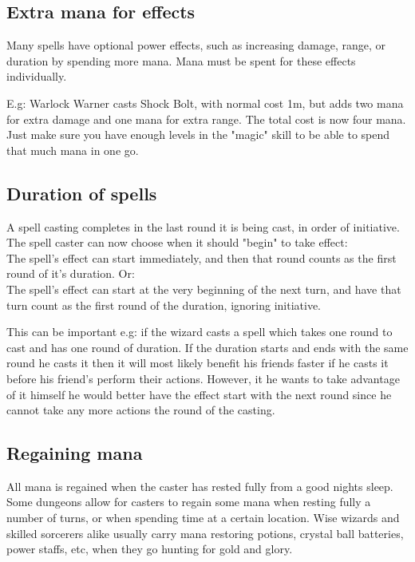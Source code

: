 \subsection*{Extra mana for effects}
Many spells have optional power effects, such as increasing damage, range, or duration by spending more mana. Mana must be spent for these effects individually.

E.g: Warlock Warner casts Shock Bolt, with normal cost 1m, but adds two mana for extra damage and one mana for extra range. The total cost is now four mana.
Just make sure you have enough levels in the "magic" skill to be able to spend that much mana in one go.


\subsection*{Duration of spells}
A spell casting completes in the last round it is being cast, in order of initiative. The spell caster can now choose when it should "begin" to take effect: \\
The spell's effect can start immediately, and then that round counts as the first round of it's duration. Or: \\
The spell's effect can start at the very beginning of the next turn, and have that turn count as the first round of the duration, ignoring initiative.

This can be important e.g: if the wizard casts a spell which takes one round to cast and has one round of duration. If the duration starts and ends with the same round he casts it then it will most likely benefit his friends faster if he casts it before his friend's perform their actions. However, it he wants to take advantage of it himself he would better have the effect start with the next round since he cannot take any more actions the round of the casting.


\subsection*{Regaining mana}
All mana is regained when the caster has rested fully from a good nights sleep. Some dungeons allow for casters to regain some mana when resting fully a number of turns, or when spending time at a certain location.
Wise wizards and skilled sorcerers alike usually carry mana restoring potions, crystal ball batteries, power staffs, etc, when they go hunting for gold and glory.


